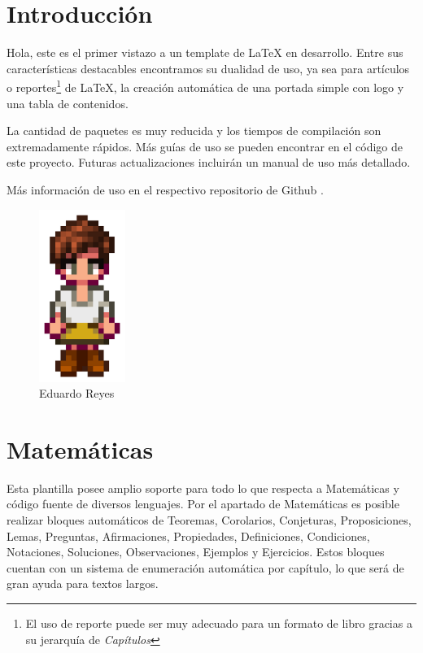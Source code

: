 \section{Introducción}

\noindent
Hola, este es el primer vistazo a un template de \LaTeX{} en desarrollo. Entre sus características destacables encontramos su dualidad de uso, ya sea para artículos o reportes\footnote{El uso de reporte puede ser muy adecuado para un formato de libro gracias a su jerarquía de \textit{Capítulos}} de \LaTeX{}, la creación automática de una portada simple con logo y una tabla de contenidos.

La cantidad de paquetes es muy reducida y los tiempos de compilación son extremadamente rápidos. Más guías de uso se pueden encontrar en el código de este proyecto. Futuras actualizaciones incluirán un manual de uso más detallado. 

Más información de uso en el respectivo repositorio de Github \cite{opc:EduardoReyes}.

\begin{figure}[h]
    \centering
    \includegraphics[width=0.25\textwidth]{src/img/logo/author.pdf}
    \caption{Eduardo Reyes}
    \label{fig:authorvector}
\end{figure}

\newpage

\section{Matemáticas}

\noindent
Esta plantilla posee amplio soporte para todo lo que respecta a Matemáticas y código fuente de diversos lenguajes. Por el apartado de Matemáticas es posible realizar bloques automáticos de Teoremas, Corolarios, Conjeturas, Proposiciones, Lemas, Preguntas, Afirmaciones, Propiedades, Definiciones, Condiciones, Notaciones, Soluciones, Observaciones, Ejemplos y Ejercicios. Estos bloques cuentan con un sistema de enumeración automática por capítulo, lo que será de gran ayuda para textos largos.

